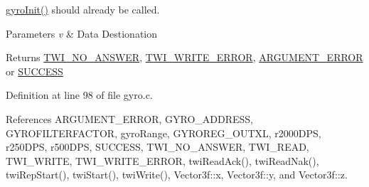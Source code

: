 \hyperlink{group__gyro_ga276b9ab6ac85c65b5a55356c00958be7}{gyro\-Init()} should already be called. 
\begin{DoxyParams}{Parameters}
{\em v} & Data Destionation \\
\hline
\end{DoxyParams}
\begin{DoxyReturn}{Returns}
\hyperlink{group__error_gga2c3e4bb40f36b262a5214e2da2bca9c5a04d5943ba652af2205c88b247e0c659c}{T\-W\-I\-\_\-\-N\-O\-\_\-\-A\-N\-S\-W\-E\-R}, \hyperlink{group__error_gga2c3e4bb40f36b262a5214e2da2bca9c5ac0e3b3463dcaf220e54794b4711708c9}{T\-W\-I\-\_\-\-W\-R\-I\-T\-E\-\_\-\-E\-R\-R\-O\-R}, \hyperlink{group__error_gga2c3e4bb40f36b262a5214e2da2bca9c5a49ccf277a69dd938c591928aa27c66cc}{A\-R\-G\-U\-M\-E\-N\-T\-\_\-\-E\-R\-R\-O\-R} or \hyperlink{group__error_gga2c3e4bb40f36b262a5214e2da2bca9c5ac7f69f7c9e5aea9b8f54cf02870e2bf8}{S\-U\-C\-C\-E\-S\-S} 
\end{DoxyReturn}


Definition at line 98 of file gyro.\-c.



References A\-R\-G\-U\-M\-E\-N\-T\-\_\-\-E\-R\-R\-O\-R, G\-Y\-R\-O\-\_\-\-A\-D\-D\-R\-E\-S\-S, G\-Y\-R\-O\-F\-I\-L\-T\-E\-R\-F\-A\-C\-T\-O\-R, gyro\-Range, G\-Y\-R\-O\-R\-E\-G\-\_\-\-O\-U\-T\-X\-L, r2000\-D\-P\-S, r250\-D\-P\-S, r500\-D\-P\-S, S\-U\-C\-C\-E\-S\-S, T\-W\-I\-\_\-\-N\-O\-\_\-\-A\-N\-S\-W\-E\-R, T\-W\-I\-\_\-\-R\-E\-A\-D, T\-W\-I\-\_\-\-W\-R\-I\-T\-E, T\-W\-I\-\_\-\-W\-R\-I\-T\-E\-\_\-\-E\-R\-R\-O\-R, twi\-Read\-Ack(), twi\-Read\-Nak(), twi\-Rep\-Start(), twi\-Start(), twi\-Write(), Vector3f\-::x, Vector3f\-::y, and Vector3f\-::z.


